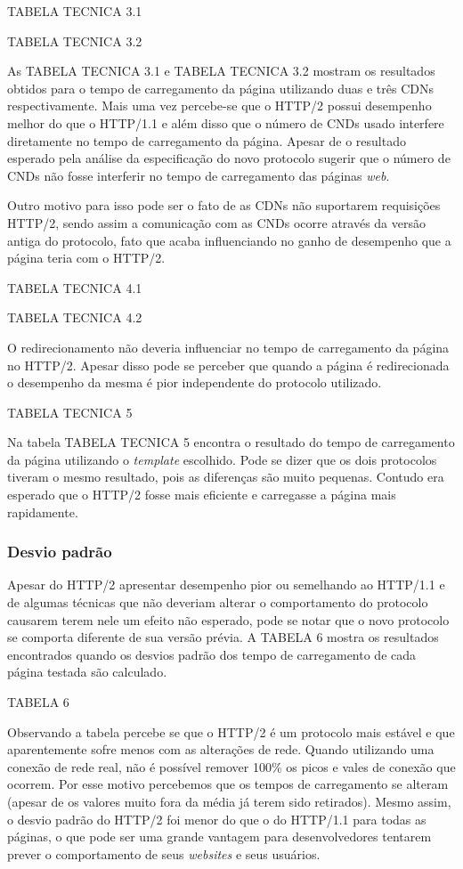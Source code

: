 TABELA TECNICA 3.1

TABELA TECNICA 3.2

As TABELA TECNICA 3.1 e TABELA TECNICA 3.2 mostram os resultados obtidos para o tempo de carregamento da página utilizando duas e três CDNs respectivamente. Mais uma vez percebe-se que o HTTP/2 possui desempenho melhor do que o HTTP/1.1 e além disso que o número de CNDs usado interfere diretamente no tempo de carregamento da página. Apesar de o resultado esperado pela análise da especificação do novo protocolo sugerir que o número de CNDs não fosse interferir no tempo de carregamento das páginas \textit{web}.

Outro motivo para isso pode ser o fato de as CDNs não suportarem requisições HTTP/2, sendo assim a comunicação com as CNDs ocorre através da versão antiga do protocolo, fato que acaba influenciando no ganho de desempenho que a página teria com o HTTP/2.

TABELA TECNICA 4.1

TABELA TECNICA 4.2

O redirecionamento não deveria influenciar no tempo de carregamento da página no HTTP/2. Apesar disso pode se perceber que quando a página é redirecionada o desempenho da mesma é pior independente do protocolo utilizado.

TABELA TECNICA 5

Na tabela TABELA TECNICA 5 encontra o resultado do tempo de carregamento da página utilizando o \textit{template} escolhido. Pode se dizer que os dois protocolos tiveram o mesmo resultado, pois as diferenças são muito pequenas. Contudo era esperado que o HTTP/2 fosse mais eficiente e carregasse a página mais rapidamente.

\subsubsection{Desvio padrão}
\label{desviopadrao}

Apesar do HTTP/2 apresentar desempenho pior ou semelhando ao HTTP/1.1 e de algumas técnicas que não deveriam alterar o comportamento do protocolo causarem terem nele um efeito não esperado, pode se notar que o novo protocolo se comporta diferente de sua versão prévia. A TABELA 6 mostra os resultados encontrados quando os desvios padrão dos tempo de carregamento de cada página testada são calculado.

TABELA 6

Observando a tabela percebe se que o HTTP/2 é um protocolo mais estável e que aparentemente sofre menos com as alterações de rede. Quando utilizando uma conexão de rede real, não é possível remover 100\% os picos e vales de conexão que ocorrem. Por esse motivo percebemos que os tempos de carregamento se alteram (apesar de os valores muito fora da média já terem sido retirados). Mesmo assim, o desvio padrão do HTTP/2 foi menor do que o do HTTP/1.1 para todas as páginas, o que pode ser uma grande vantagem para desenvolvedores tentarem prever o comportamento de seus \textit{websites} e seus usuários.

